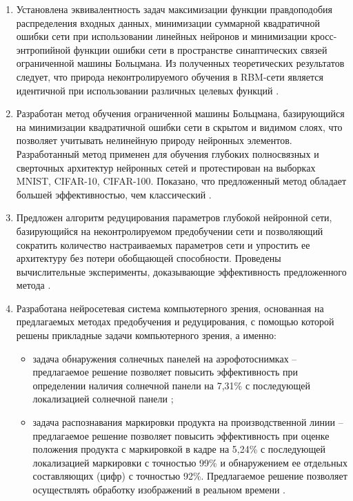 \begin{enumerate}[wide, labelindent=10mm]

\item Установлена эквивалентность задач максимизации функции правдоподобия распределения входных данных, минимизации суммарной квадратичной ошибки сети при использовании линейных нейронов и минимизации кросс-энтропийной функции ошибки сети в пространстве синаптических связей ограниченной машины Больцмана. Из полученных теоретических результатов следует, что природа неконтролируемого обучения в RBM-сети является идентичной при использовании различных целевых функций \cite{2-A, 4-A, 5-A, 10-A, 3-A, 12-A, 13-A}.
\item Разработан метод обучения ограниченной машины Больцмана, базирующийся на минимизации квадратичной ошибки сети в скрытом и видимом слоях, что позволяет учитывать нелинейную природу нейронных элементов. Разработанный метод применен для обучения глубоких полносвязных и сверточных архитектур нейронных сетей и протестирован на выборках MNIST, CIFAR-10, CIFAR-100. Показано, что предложенный метод обладает большей эффективностью, чем классический \cite{2-A, 4-A, 5-A, 10-A, 3-A, 1-A, 19-A, 12-A, 20-A, 13-A, 17-A, 18-A, 21-A, 22-A}.
\item Предложен алгоритм редуцирования параметров глубокой нейронной сети, базирующийся на неконтролируемом предобучении сети и позволяющий сократить количество настраиваемых параметров сети и упростить ее архитектуру без потери обобщающей способности. Проведены вычислительные эксперименты, доказывающие эффективность предложенного метода \cite{11-A, 30-A, 16-A}.
\item Разработана нейросетевая система компьютерного зрения, основанная на предлагаемых методах предобучения и редуцирования, с помощью которой решены прикладные задачи компьютерного зрения, а именно: 

    \begin{itemize}
        \item задача обнаружения солнечных панелей на аэрофотоснимках -- предлагаемое решение позволяет повысить эффективность при определении наличия солнечной панели на 7,31\% с последующей локализацией солнечной панели \cite{9-A, 14-A, 15-A};
        \item задача распознавания маркировки продукта на производственной линии -- предлагаемое решение позволяет повысить эффективность при оценке положения продукта с маркировкой в кадре на 5,24\% с последующей локализацией маркировки с точностью 99\% и обнаружением ее отдельных составляющих (цифр) с точностью 92\%. Предлагаемое решение позволяет осуществлять обработку изображений в реальном времени \cite{7-A, 29-A, 6-A, 25-A, 27-A, 23-A, 24-A, 8-A, 26-A, 28-A}.
    \end{itemize}


\end{enumerate}
